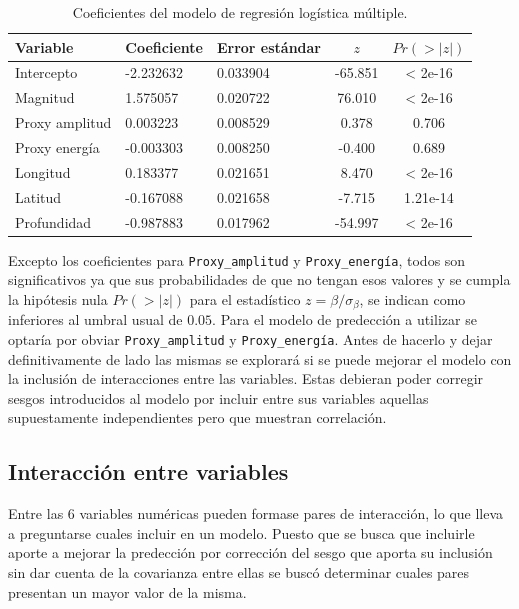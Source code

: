 \documentclass[a4paper]{report}
\begin{document}
\begin{table}[!ht]
 	\centering
 	\begin{tabular}{lllcc}
 		\toprule
 		Variable & Coeficiente & Error estándar & \(z\) & \(Pr(>|z|)\) \\
 		\midrule
 		Intercepto & -2.232632 & 0.033904 & -65.851 & < 2e-16 \\
 		Magnitud & 1.575057 & 0.020722 & 76.010 & < 2e-16 \\
 		Proxy amplitud & 0.003223 & 0.008529 & 0.378 & 0.706 \\
 		Proxy energía & -0.003303 & 0.008250 & -0.400 & 0.689 \\
 		Longitud & 0.183377 & 0.021651 & 8.470 & < 2e-16 \\
 		Latitud & -0.167088 & 0.021658 & -7.715 & 1.21e-14 \\
 		Profundidad & -0.987883 & 0.017962 & -54.997 & < 2e-16 \\
 		\bottomrule
 	\end{tabular}
 	\caption{Coeficientes del modelo de regresión logística múltiple.}
 	\label{tab:coeficientes}
\end{table}

Excepto los coeficientes para \lstinline[language = R]'Proxy_amplitud' y  \lstinline[language = R]'Proxy_energía', todos son significativos ya que sus probabilidades de que no tengan esos valores y se cumpla la hipótesis nula \(Pr(>|z|)\) para el estadístico \(z = \beta / \sigma_\beta\), se indican como inferiores al umbral usual de \(0.05\).
Para el modelo de predección a utilizar se optaría por obviar \lstinline[language = R]'Proxy_amplitud' y  \lstinline[language = R]'Proxy_energía'.
Antes de hacerlo y dejar definitivamente de lado las mismas se explorará si se puede mejorar el modelo con la inclusión de interacciones entre las variables.
Estas debieran poder corregir sesgos introducidos al modelo por incluir entre sus variables aquellas supuestamente independientes pero que muestran correlación.




\subsection{Interacción entre variables}\label{sec:logística_con_interacción}
Entre las 6 variables numéricas pueden formase pares de interacción, lo que lleva a preguntarse cuales incluir en un modelo.
Puesto que se busca que incluirle aporte a mejorar la predección por corrección del sesgo que aporta su inclusión sin dar cuenta de la covarianza entre ellas se buscó determinar cuales pares presentan un mayor valor de la misma.
\end{document}
